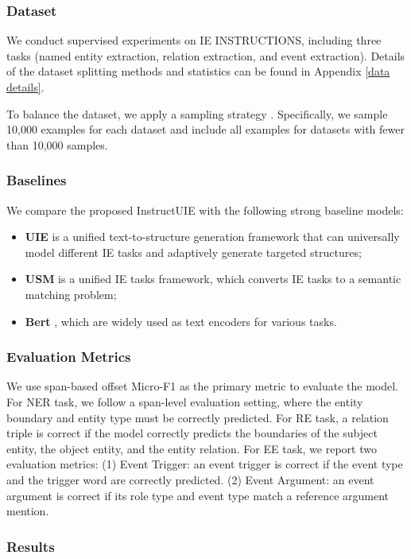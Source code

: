 \documentclass[11pt]{article}
\begin{document}
\subsubsection{Dataset}
We conduct supervised experiments on IE INSTRUCTIONS, including three tasks (named entity extraction, relation extraction, and event extraction). 
Details of the dataset splitting methods and statistics can be found in Appendix \ref{data details}.

To balance the dataset, we apply a sampling strategy \cite{poolsawad2014balancing}. Specifically, we sample 10,000 examples for each dataset and include all examples for datasets with fewer than 10,000 samples.

\subsubsection{Baselines}
\label{supervise-baseline}
We compare the proposed InstructUIE with the following strong baseline models:
\begin{itemize}
\item \textbf{UIE} \cite{UIE} is a unified text-to-structure generation framework that can universally model different IE tasks and adaptively generate targeted structures;
\item \textbf{USM} \cite{USM} is a unified IE tasks framework, which converts IE tasks to a semantic matching problem;
\item \textbf{Bert} \cite{devlin-etal-2019-bert}, which are widely used as text encoders for various tasks.
\end{itemize}

\subsubsection{Evaluation Metrics}
We use span-based offset Micro-F1 as the primary metric to evaluate the model. For NER task, we follow a span-level evaluation setting, where the entity boundary and entity type must be correctly predicted. For RE task, a relation triple is correct if the model correctly predicts the boundaries of the subject entity, the object entity, and the entity relation. For EE task, we report two evaluation metrics: (1) Event Trigger: an event trigger is correct if the event type and the trigger word are correctly predicted. (2) Event Argument: an event argument is correct if its role type and event type match a reference argument mention.

\subsubsection{Results}
\end{document}
